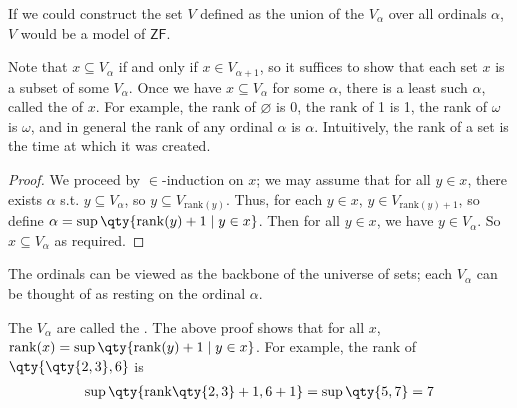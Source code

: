 If we could construct the set $V$ defined as the union of the $V_\alpha$ over all ordinals $\alpha$, $V$ would be a model of $\mathsf{ZF}$.
\begin{remark}
    Note that $x \subseteq V_\alpha$ if and only if $x \in V_{\alpha+1}$, so it suffices to show that each set $x$ is a subset of some $V_\alpha$.
    Once we have $x \subseteq V_\alpha$ for some $\alpha$, there is a least such $\alpha$, called the  of $x$.
    For example, the rank of $\varnothing$ is 0, the rank of 1 is 1, the rank of $\omega$ is $\omega$, and in general the rank of any ordinal $\alpha$ is $\alpha$.
    Intuitively, the rank of a set is the time at which it was created.
\end{remark}
\begin{proof}
    We proceed by $\in$-induction on $x$; we may assume that for all $y \in x$, there exists $\alpha$ s.t. $y \subseteq V_\alpha$, so $y \subseteq V_{\mathrm{rank}(y)}$.
    Thus, for each $y \in x$, $y \in V_{\mathrm{rank}(y)+1}$, so define $\alpha = \sup\qty{\mathrm{rank}(y) + 1 \mid y \in x}$.
    Then for all $y \in x$, we have $y \in V_\alpha$.
    So $x \subseteq V_\alpha$ as required.
\end{proof}
The ordinals can be viewed as the backbone of the universe of sets; each $V_\alpha$ can be thought of as resting on the ordinal $\alpha$.
\begin{remark}
    The $V_\alpha$ are called the .
    The above proof shows that for all $x$, $\mathrm{rank}(x) = \sup\qty{\mathrm{rank}(y) + 1 \mid y \in x}$.
    For example, the rank of $\qty{\qty{2, 3}, 6}$ is
    \begin{align*}
        \sup\qty{\mathrm{rank}\qty{2, 3} + 1, 6 + 1} = \sup\qty{5, 7} = 7
    \end{align*}
\end{remark}
